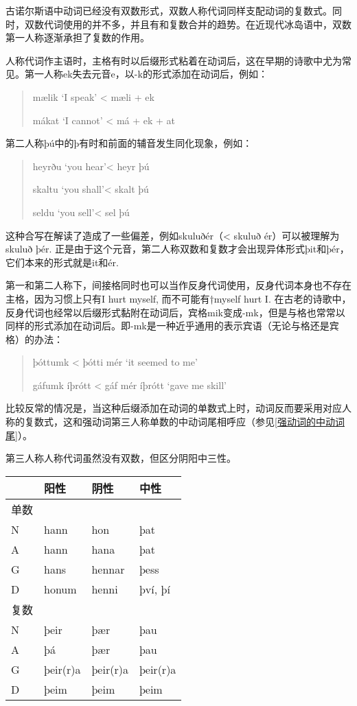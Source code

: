 古诺尔斯语中动词已经没有双数形式，双数人称代词同样支配动词的复数式。同时，双数代词使用的并不多，并且有和复数合并的趋势。在近现代冰岛语中，双数第一人称逐渐承担了复数的作用。

人称代词作主语时，主格有时以后缀形式粘着在动词后，这在早期的诗歌中尤为常见。第一人称ek失去元音e，以-k的形式添加在动词后，例如：

\begin{quote}
  mælik `I speak‌' \textless{} mæli + ek

  mákat `I cannot‌' \textless{} má + ek + at
\end{quote}

第二人称þú中的þ有时和前面的辅音发生同化现象，例如：

\begin{quote}
  heyrðu `you hear'\textless{} heyr þú

  skaltu `you shall'\textless{} skalt þú

  seldu `you sell'\textless{} sel þú
\end{quote}

这种合写在解读了造成了一些偏差，例如skuluðér（\textless{} skuluð
ér）可以被理解为skuluð þér.
正是由于这个元音，第二人称双数和复数才会出现异体形式þit和þér，它们本来的形式就是it和ér.

第一和第二人称下，间接格同时也可以当作反身代词使用，反身代词本身也不存在主格，因为习惯上只有I
hurt myself, 而不可能有†myself hurt I.
在古老的诗歌中，反身代词也经常以后缀形式黏附在动词后，宾格mik变成-mk，但是与格也常常以同样的形式添加在动词后。即-mk是一种近乎通用的表示宾语（无论与格还是宾格）的办法：

\begin{quote}
  þóttumk \textless{} þótti mér `it seemed to me‌'

  gáfumk íþrótt \textless{} gáf mér íþrótt `gave me skill'
\end{quote}

比较反常的情况是，当这种后缀添加在动词的单数式上时，动词反而要采用对应人称的复数式，这和强动词第三人称单数的中动词尾相呼应（参见\ref{强动词的中动词尾}）。

第三人称人称代词虽然没有双数，但区分阴阳中三性。

\begin{longtable}{llll}
  \toprule
     & 阳性       & 阴性       & 中性       \\
  \midrule
  \endhead
  \bottomrule
  \endfoot
  单数 &          &          &          \\
  N  & hann     & hon      & þat      \\
  A  & hann     & hana     & þat      \\
  G  & hans     & hennar   & þess     \\
  D  & honum    & henni    & því, þí  \\
  复数 &          &          &          \\
  N  & þeir     & þær      & þau      \\
  A  & þá       & þær      & þau      \\
  G  & þeir(r)a & þeir(r)a & þeir(r)a \\
  D  & þeim     & þeim     & þeim     \\
\end{longtable}


